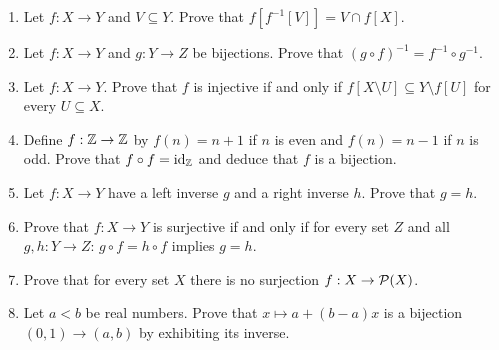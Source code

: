 \begin{stretchbox}[3]
\begin{enumerate}[label=\textbf{S3.\arabic*}, leftmargin=3em]
\item Let $f:X\to Y$ and $V\subseteq Y$. Prove that $f[f^{-1}[V]]=V\cap f[X]$.
\item Let $f:X\to Y$ and $g:Y\to Z$ be bijections. Prove that $(g\circ f)^{-1}=f^{-1}\circ g^{-1}$. 
\item Let $f:X\to Y$. Prove that $f$ is injective if and only if $f[X\setminus U]\subseteq Y\setminus f[U]$ for every $U\subseteq X$. 
\item Define $f:\mathbb{Z}\to\mathbb{Z}$ by $f(n)=n+1$ if $n$ is even and $f(n)=n-1$ if $n$ is odd. Prove that $f\circ f=\mathrm{id}_{\mathbb{Z}}$ and deduce that $f$ is a bijection.
\item Let $f:X\to Y$ have a left inverse $g$ and a right inverse $h$. Prove that $g=h$.
\item Prove that $f:X\to Y$ is surjective if and only if for every set $Z$ and all $g,h:Y\to Z$: $g\circ f=h\circ f$ implies $g=h$. 
\item Prove that for every set $X$ there is no surjection $f:X\to\mathcal{P}(X)$. 
\item Let $a<b$ be real numbers. Prove that $x\mapsto a+(b-a)x$ is a bijection $(0,1)\to(a,b)$ by exhibiting its inverse.
\end{enumerate}
\end{stretchbox}
